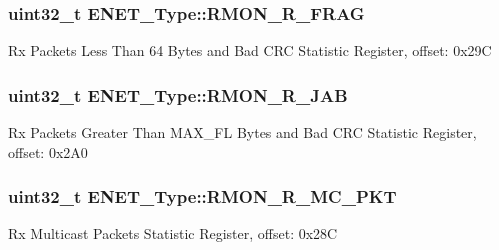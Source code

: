 \subsubsection[{\texorpdfstring{R\+M\+O\+N\+\_\+\+R\+\_\+\+F\+R\+AG}{RMON_R_FRAG}}]{ uint32\+\_\+t E\+N\+E\+T\+\_\+\+Type\+::\+R\+M\+O\+N\+\_\+\+R\+\_\+\+F\+R\+AG}\hypertarget{structENET__Type_a511924537260f67b727f2d99846c8cc4}{}\label{structENET__Type_a511924537260f67b727f2d99846c8cc4}
Rx Packets Less Than 64 Bytes and Bad C\+RC Statistic Register, offset\+: 0x29C 
\subsubsection[{\texorpdfstring{R\+M\+O\+N\+\_\+\+R\+\_\+\+J\+AB}{RMON_R_JAB}}]{ uint32\+\_\+t E\+N\+E\+T\+\_\+\+Type\+::\+R\+M\+O\+N\+\_\+\+R\+\_\+\+J\+AB}\hypertarget{structENET__Type_a0da030274992826fae35e8d53993793a}{}\label{structENET__Type_a0da030274992826fae35e8d53993793a}
Rx Packets Greater Than M\+A\+X\+\_\+\+FL Bytes and Bad C\+RC Statistic Register, offset\+: 0x2\+A0 
\subsubsection[{\texorpdfstring{R\+M\+O\+N\+\_\+\+R\+\_\+\+M\+C\+\_\+\+P\+KT}{RMON_R_MC_PKT}}]{ uint32\+\_\+t E\+N\+E\+T\+\_\+\+Type\+::\+R\+M\+O\+N\+\_\+\+R\+\_\+\+M\+C\+\_\+\+P\+KT}\hypertarget{structENET__Type_ac05a62272ea68439ef16c7e91213c94d}{}\label{structENET__Type_ac05a62272ea68439ef16c7e91213c94d}
Rx Multicast Packets Statistic Register, offset\+: 0x28C 
